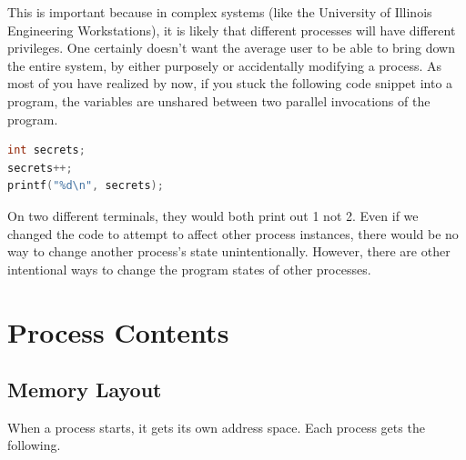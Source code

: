 This is important because in complex systems (like the University of Illinois Engineering Workstations), it is likely that different processes will have different privileges.
One certainly doesn't want the average user to be able to bring down the entire system, by either purposely or accidentally modifying a process.
As most of you have realized by now, if you stuck the following code snippet into a program, the variables are unshared between two parallel invocations of the program.

\begin{lstlisting}[language=C]
int secrets;
secrets++;
printf("%d\n", secrets);
\end{lstlisting}

On two different terminals, they would both print out 1 not 2.
Even if we changed the code to attempt to affect other process instances, there would be no way to change another process's state unintentionally.
However, there are other intentional ways to change the program states of other processes.

\section{Process Contents}

\subsection{Memory Layout}

When a process starts, it gets its own address space.
Each process gets the following.

